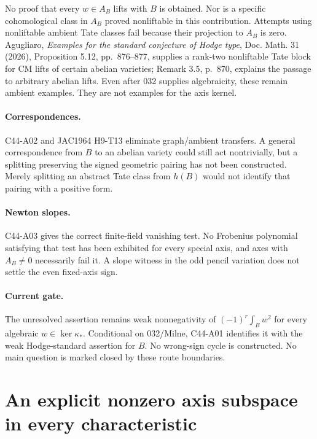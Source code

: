 \documentclass[11pt]{article}
\theoremstyle{remark}\newtheorem{remark}[theorem]{Remark}
\begin{document}
No proof that every $w\in A_B$ lifts with $B$ is obtained.
Nor is a specific cohomological class in $A_B$ proved
nonliftable in this contribution. Attempts using nonliftable
ambient Tate classes fail because their projection to $A_B$
is zero. Agugliaro, \emph{Examples for the standard conjecture
of Hodge type}, Doc. Math. 31 (2026), Proposition 5.12,
pp.~876--877, supplies a rank-two nonliftable Tate block for
CM lifts of certain abelian varieties; Remark 3.5, p.~870,
explains the passage to arbitrary abelian lifts. Even after
032 supplies algebraicity, these remain ambient examples.
They are not examples for the axis kernel.

\paragraph{Correspondences.}
C44-A02 and JAC1964 H9-T13 eliminate graph/ambient transfers.
A general correspondence from $B$ to an abelian variety could
still act nontrivially, but a splitting preserving the signed
geometric pairing has not been constructed. Merely splitting
an abstract Tate class from $h(B)$ would not identify that
pairing with a positive form.

\paragraph{Newton slopes.}
C44-A03 gives the correct finite-field vanishing test.
No Frobenius polynomial satisfying that test has been exhibited
for every special axis, and axes with $A_B\ne0$ necessarily
fail it. A slope witness in the odd pencil variation does not
settle the even fixed-axis sign.

\paragraph{Current gate.}
The unresolved assertion remains weak nonnegativity of
$(-1)^r\int_Bw^2$ for every algebraic $w\in\ker\kappa_*$.
Conditional on 032/Milne, C44-A01 identifies it with the weak
Hodge-standard assertion for $B$. No wrong-sign cycle is
constructed. No main question is marked closed by these
route boundaries.


\section{An explicit nonzero axis subspace in every characteristic}
\end{document}
